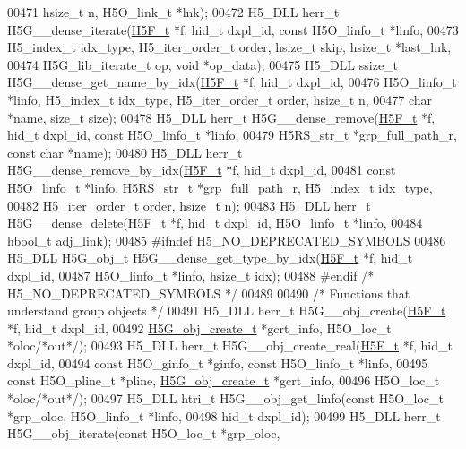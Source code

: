 \begin{DoxyCode}
00471     hsize\_t n, H5O\_link\_t *lnk);
00472 H5\_DLL herr\_t H5G\_\_dense\_iterate(\hyperlink{struct_h5_f__t}{H5F\_t} *f, hid\_t dxpl\_id, \textcolor{keyword}{const} H5O\_linfo\_t *linfo,
00473     H5\_index\_t idx\_type, H5\_iter\_order\_t order, hsize\_t skip, hsize\_t *last\_lnk,
00474     H5G\_lib\_iterate\_t op, \textcolor{keywordtype}{void} *op\_data);
00475 H5\_DLL ssize\_t H5G\_\_dense\_get\_name\_by\_idx(\hyperlink{struct_h5_f__t}{H5F\_t}  *f, hid\_t dxpl\_id,
00476     H5O\_linfo\_t *linfo, H5\_index\_t idx\_type, H5\_iter\_order\_t order, hsize\_t n,
00477     \textcolor{keywordtype}{char} *name, \textcolor{keywordtype}{size\_t} size);
00478 H5\_DLL herr\_t H5G\_\_dense\_remove(\hyperlink{struct_h5_f__t}{H5F\_t} *f, hid\_t dxpl\_id, \textcolor{keyword}{const} H5O\_linfo\_t *linfo,
00479     H5RS\_str\_t *grp\_full\_path\_r, \textcolor{keyword}{const} \textcolor{keywordtype}{char} *name);
00480 H5\_DLL herr\_t H5G\_\_dense\_remove\_by\_idx(\hyperlink{struct_h5_f__t}{H5F\_t} *f, hid\_t dxpl\_id,
00481     \textcolor{keyword}{const} H5O\_linfo\_t *linfo, H5RS\_str\_t *grp\_full\_path\_r, H5\_index\_t idx\_type,
00482     H5\_iter\_order\_t order, hsize\_t n);
00483 H5\_DLL herr\_t H5G\_\_dense\_delete(\hyperlink{struct_h5_f__t}{H5F\_t} *f, hid\_t dxpl\_id, H5O\_linfo\_t *linfo,
00484     hbool\_t adj\_link);
00485 \textcolor{preprocessor}{#ifndef H5\_NO\_DEPRECATED\_SYMBOLS}
00486 H5\_DLL H5G\_obj\_t H5G\_\_dense\_get\_type\_by\_idx(\hyperlink{struct_h5_f__t}{H5F\_t}  *f, hid\_t dxpl\_id,
00487     H5O\_linfo\_t *linfo, hsize\_t idx);
00488 \textcolor{preprocessor}{#endif }\textcolor{comment}{/* H5\_NO\_DEPRECATED\_SYMBOLS */}\textcolor{preprocessor}{}
00489 
00490 \textcolor{comment}{/* Functions that understand group objects */}
00491 H5\_DLL herr\_t H5G\_\_obj\_create(\hyperlink{struct_h5_f__t}{H5F\_t} *f, hid\_t dxpl\_id,
00492     \hyperlink{struct_h5_g__obj__create__t}{H5G\_obj\_create\_t} *gcrt\_info, H5O\_loc\_t *oloc\textcolor{comment}{/*out*/});
00493 H5\_DLL herr\_t H5G\_\_obj\_create\_real(\hyperlink{struct_h5_f__t}{H5F\_t} *f, hid\_t dxpl\_id,
00494     \textcolor{keyword}{const} H5O\_ginfo\_t *ginfo, \textcolor{keyword}{const} H5O\_linfo\_t *linfo,
00495     \textcolor{keyword}{const} H5O\_pline\_t *pline, \hyperlink{struct_h5_g__obj__create__t}{H5G\_obj\_create\_t} *gcrt\_info,
00496     H5O\_loc\_t *oloc\textcolor{comment}{/*out*/});
00497 H5\_DLL htri\_t H5G\_\_obj\_get\_linfo(\textcolor{keyword}{const} H5O\_loc\_t *grp\_oloc, H5O\_linfo\_t *linfo,
00498     hid\_t dxpl\_id);
00499 H5\_DLL herr\_t H5G\_\_obj\_iterate(\textcolor{keyword}{const} H5O\_loc\_t *grp\_oloc,

\end{DoxyCode}
